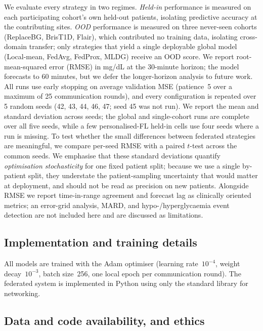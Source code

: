 \documentclass[10pt,letterpaper]{article}
\begin{document}
We evaluate every strategy in two regimes. \emph{Held-in} performance is measured
on each participating cohort's own held-out patients, isolating predictive
accuracy at the contributing sites. \emph{OOD} performance is measured on three
never-seen cohorts (ReplaceBG, BrisT1D, Flair), which contributed no training
data, isolating cross-domain transfer; only strategies that yield a single
deployable global model (Local-mean, FedAvg, FedProx, MLDG) receive an OOD score.
We report root-mean-squared error (RMSE) in mg/dL at the 30-minute horizon; the
model forecasts to 60 minutes, but we defer the longer-horizon analysis to future
work. All runs use early stopping on average validation MSE (patience~5 over a
maximum of 25 communication rounds), and every configuration is repeated over 5
random seeds (42, 43, 44, 46, 47; seed 45 was not run). We report the mean and
standard deviation across seeds; the global and single-cohort runs are complete
over all five seeds, while a few personalised-FL held-in cells use four seeds
where a run is missing. To test whether the small differences between federated
strategies are meaningful, we compare per-seed RMSE with a paired $t$-test across
the common seeds. We emphasise that these standard deviations quantify
\emph{optimisation stochasticity} for one fixed patient split; because we use a
single by-patient split, they understate the patient-sampling uncertainty that
would matter at deployment, and should not be read as precision on new patients.
Alongside RMSE we report time-in-range agreement and forecast lag as
clinically oriented metrics; an error-grid analysis, MARD, and
hypo-/hyperglycaemia event detection are not included here and are discussed as
limitations.

\subsection*{Implementation and training details}

All models are trained with the Adam optimiser (learning rate~$10^{-4}$, weight
decay~$10^{-3}$, batch size~256, one local epoch per communication round). The
federated system is implemented in Python using only the standard library for
networking.

\subsection*{Data and code availability, and ethics}
\end{document}
